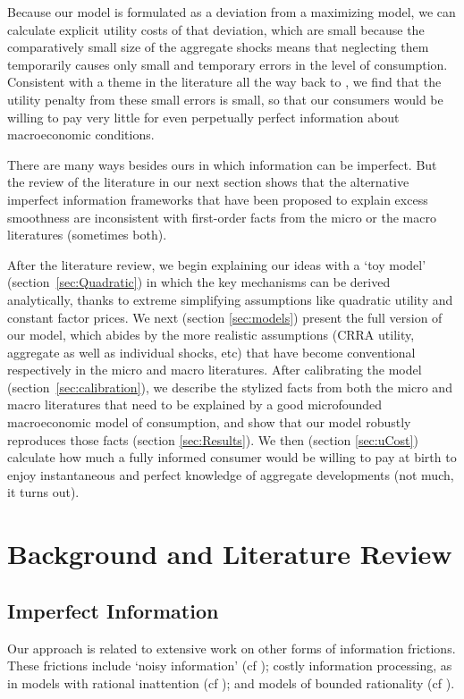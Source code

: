 \documentclass[titlepage]{./econtex}
\begin{document}
Because our model is formulated as a deviation from a maximizing model, we can calculate explicit utility costs of that deviation, which are small because the comparatively small size of the aggregate shocks means that neglecting them temporarily causes only small and temporary errors in the level of consumption.  Consistent with a theme in the literature all the way back to \cite{ayNearRational}, we find that the utility penalty from these small errors is small, so that our consumers would be willing to pay very little for even perpetually perfect information about macroeconomic conditions.

There are many ways besides ours in which information can be imperfect.  But the review of the literature in our next section shows that the alternative imperfect information frameworks that have been proposed to explain excess smoothness are inconsistent with first-order facts from the micro or the macro literatures (sometimes both).

After the literature review, we begin explaining our ideas with a `toy model' (section~\ref{sec:Quadratic}) in which the key mechanisms can be derived analytically, thanks to extreme simplifying assumptions like quadratic utility and constant factor prices.  We next (section \ref{sec:models}) present the full version of our model, which abides by the more realistic assumptions (CRRA utility, aggregate as well as individual shocks, etc) that have become conventional respectively in the micro and macro literatures. After calibrating the model (section~\ref{sec:calibration}), we describe the stylized facts from both the micro and macro literatures that need to be explained by a good microfounded macroeconomic model of consumption, and show that our model robustly reproduces those facts (section \ref{sec:Results}).
We then (section \ref{sec:uCost}) calculate how much a fully informed consumer would be willing to pay at birth to enjoy instantaneous and perfect knowledge of aggregate developments (not much, it turns out).


\section{Background and Literature Review}\label{sec:relation}

\subsection{Imperfect Information}
Our approach is related to extensive work on other forms of information frictions. These frictions include `noisy information' (cf \cite{pischkeMicroMacro}); costly information processing, as in models with rational inattention (cf \cite{simsInattention}); and models of bounded rationality (cf \cite{gabaixSparsityQJE}).
\end{document}
